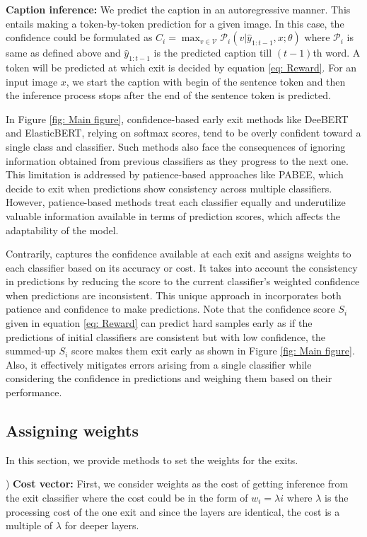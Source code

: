 \textbf{Caption inference:} We predict the caption in an autoregressive manner. This entails making a token-by-token prediction for a given image. In this case, the confidence could be formulated as $C_i = \max_{v\in \mathcal{V}}\mathcal{P}_i(v|\hat{y}_{1:t-1}, x; \theta)$ where $\mathcal{P}_i$ is same as defined above and $\hat{y}_{1:t-1}$ is the predicted caption till $(t-1)$th word. A token will be predicted at which exit is decided by equation \ref{eq: Reward}. For an input image $x$, we start the caption with begin of the sentence token and then the inference process stops after the end of the sentence token is predicted. 

In Figure \ref{fig: Main figure}, confidence-based early exit methods like DeeBERT and ElasticBERT, relying on softmax scores, tend to be overly confident toward a single class and classifier. Such methods also face the consequences of ignoring information obtained from previous classifiers as they progress to the next one. This limitation is addressed by patience-based approaches like PABEE, which decide to exit when predictions show consistency across multiple classifiers. However, patience-based methods treat each classifier equally and underutilize valuable information available in terms of prediction scores, which affects the adaptability of the model.

Contrarily, \algo{} captures the confidence available at each exit and assigns weights to each classifier based on its accuracy or cost. It takes into account the consistency in predictions by reducing the score to the current classifier's weighted confidence when predictions are inconsistent. This unique approach in \algo{} incorporates both patience and confidence to make predictions. Note that the confidence score $S_i$ given in equation \ref{eq: Reward} can predict hard samples early as if the predictions of initial classifiers are consistent but with low confidence, the summed-up $S_i$ score makes them exit early as shown in Figure \ref{fig: Main figure}. Also, it effectively mitigates errors arising from a single classifier while considering the confidence in predictions and weighing them based on their performance.

\subsection{Assigning weights}
In this section, we provide methods to set the weights for the exits.

) \textbf{Cost vector:} First, we consider weights as the cost of getting inference from the exit classifier where the cost could be in the form of $w_i =  \lambda i$ where $\lambda$ is the processing cost of the one exit and since the layers are identical, the cost is a multiple of $\lambda$ for deeper layers. 

